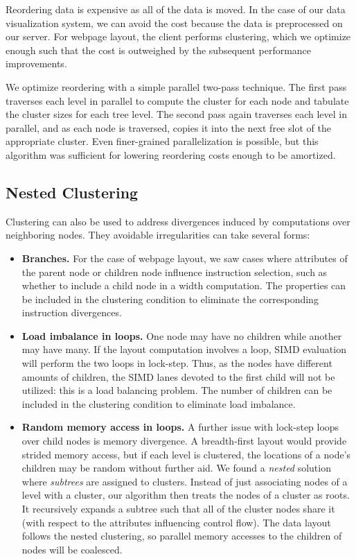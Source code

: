 Reordering data is expensive as all of the data is moved. In the case of our data visualization system, we can avoid the cost because the data is preprocessed on our server. For webpage layout, the client performs clustering, which we optimize enough such that the cost is outweighed by the subsequent performance improvements.

We optimize reordering with a simple parallel two-pass technique. The first pass traverses each level in parallel to compute the cluster for each node and tabulate the cluster sizes for each tree level. The second pass again traverses each level in parallel, and as each node is traversed, copies it into the next free slot of the appropriate cluster. Even finer-grained parallelization is possible, but this algorithm was sufficient for lowering reordering costs enough to be amortized.

\subsection{Nested Clustering}
Clustering can also be used to address divergences induced by computations over neighboring nodes. They avoidable irregularities can take several forms:

\begin{itemize}
\item \textbf{Branches.} For the case of webpage layout, we saw cases where attributes of the parent node or children node influence instruction selection, such as whether to include a child node in a width computation. The properties can be included in the clustering condition to eliminate the corresponding instruction divergences. 

\item \textbf{Load imbalance in loops.} One node may have no children while another may have many. If the layout computation involves a loop, SIMD evaluation will perform the two loops in lock-step. Thus, as the nodes have different amounts of children, the SIMD lanes devoted to the first child will not be utilized: this is a load balancing problem. The number of children can be included in the clustering condition to eliminate load imbalance.

\item \textbf{Random memory access in loops.} A further issue with lock-step loops over child nodes is memory divergence. A breadth-first layout would provide strided memory access, but if each level is clustered, the locations of a node's children may be random without further aid. We found a \emph{nested} solution where \emph{subtrees} are assigned to clusters. Instead of just associating nodes of a level with a cluster, our algorithm then treats the nodes of a cluster as roots. It recursively expands a subtree such that all of the cluster nodes share it (with respect to the attributes influencing control flow). The data layout follows the nested clustering, so parallel memory accesses to the children of nodes will be coalesced. 
\end{itemize}

